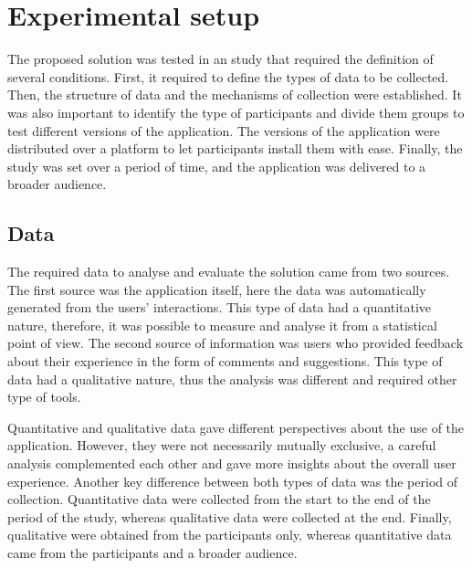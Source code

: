 
\chapter{Experimental setup} %

\label{expe} %


The proposed solution was tested in an study that required the definition of several conditions. First, it required to define the types of data to be collected. Then, the structure of data and the mechanisms of collection were established. It was also important to identify the type of participants and divide them groups to test different versions of the application. The versions of the application were distributed over a platform to let participants install them with ease. Finally, the study was set over a period of time, and the application was delivered to a broader audience.

\section{Data}
The required data to analyse and evaluate the solution came from two sources. The first source was the application itself, here the data was automatically generated from the users' interactions. This type of data had a quantitative nature, therefore, it was possible to measure and analyse it from a statistical point of view. The second source of information was users who provided feedback about their experience in the form of comments and suggestions. This type of data had a qualitative nature, thus the analysis was different and required other type of tools.

Quantitative and qualitative data gave different perspectives about the use of the application. However, they were not necessarily mutually exclusive, a careful analysis complemented each other and gave more insights about the overall user experience. Another key difference between both types of data was the period of collection. Quantitative data were collected from the start to the end of the period of the study, whereas qualitative data were collected at the end. Finally, qualitative were obtained from the participants only, whereas quantitative data came from the participants and a broader audience.

